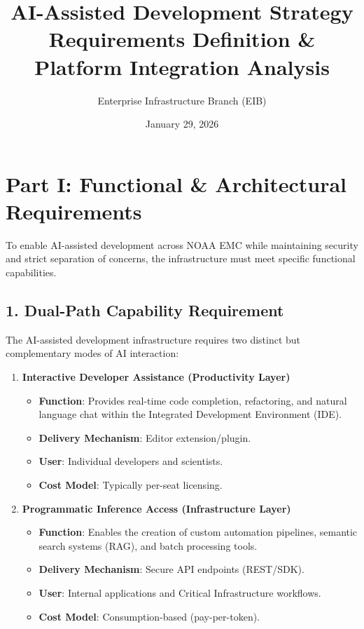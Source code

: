 \documentclass[10pt]{article}
\title{\vspace{-4ex}\textbf{AI-Assisted Development Strategy}\\[0.2ex]\normalsize Requirements Definition \& Platform Integration Analysis\vspace{-2ex}}
\author{\normalsize Enterprise Infrastructure Branch (EIB)}
\date{\vspace{-2ex}\normalsize January 29, 2026}
\begin{document}
\maketitle
\thispagestyle{fancy}

\section*{Part I: Functional \& Architectural Requirements}

To enable AI-assisted development across NOAA EMC while maintaining security and strict separation of concerns, the infrastructure must meet specific functional capabilities.

\subsection*{1. Dual-Path Capability Requirement}
The AI-assisted development infrastructure requires two distinct but complementary modes of AI interaction:

\begin{enumerate}[leftmargin=*, label=\textbf{\arabic*.}, itemsep=3pt, topsep=3pt]
    \item \textbf{Interactive Developer Assistance (Productivity Layer)}
    \begin{itemize}[label=$\circ$, nosep, leftmargin=1.5em]
        \item \textbf{Function}: Provides real-time code completion, refactoring, and natural language chat within the Integrated Development Environment (IDE).
        \item \textbf{Delivery Mechanism}: Editor extension/plugin.
        \item \textbf{User}: Individual developers and scientists.
        \item \textbf{Cost Model}: Typically per-seat licensing.
    \end{itemize}
    
    \item \textbf{Programmatic Inference Access (Infrastructure Layer)}
    \begin{itemize}[label=$\circ$, nosep, leftmargin=1.5em]
        \item \textbf{Function}: Enables the creation of custom automation pipelines, semantic search systems (RAG), and batch processing tools.
        \item \textbf{Delivery Mechanism}: Secure API endpoints (REST/SDK).
        \item \textbf{User}: Internal applications and Critical Infrastructure workflows.
        \item \textbf{Cost Model}: Consumption-based (pay-per-token).
    \end{itemize}
\end{enumerate}
\end{document}
